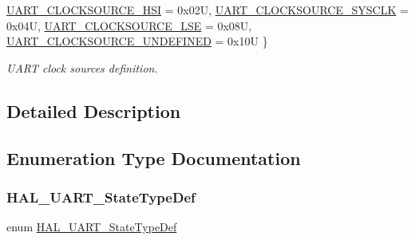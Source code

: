 \begin{DoxyCompactItemize}
\hyperlink{group___u_a_r_t___exported___types_ggad957348fe227e5cb75b70be026c5ae81af4da147f3b62642e1ce6d2cb22aff32e}{U\+A\+R\+T\+\_\+\+C\+L\+O\+C\+K\+S\+O\+U\+R\+C\+E\+\_\+\+H\+SI} = 0x02U, 
\hyperlink{group___u_a_r_t___exported___types_ggad957348fe227e5cb75b70be026c5ae81ab9abf4484d0f83bf9b3ccc8ef72a592e}{U\+A\+R\+T\+\_\+\+C\+L\+O\+C\+K\+S\+O\+U\+R\+C\+E\+\_\+\+S\+Y\+S\+C\+LK} = 0x04U, 
\hyperlink{group___u_a_r_t___exported___types_ggad957348fe227e5cb75b70be026c5ae81ab9335bad77171144c2994f1554ce3901}{U\+A\+R\+T\+\_\+\+C\+L\+O\+C\+K\+S\+O\+U\+R\+C\+E\+\_\+\+L\+SE} = 0x08U, 
\newline
\hyperlink{group___u_a_r_t___exported___types_ggad957348fe227e5cb75b70be026c5ae81a9012cc24ac82c0d7aa7558f73d770eab}{U\+A\+R\+T\+\_\+\+C\+L\+O\+C\+K\+S\+O\+U\+R\+C\+E\+\_\+\+U\+N\+D\+E\+F\+I\+N\+ED} = 0x10U
 \}\begin{DoxyCompactList}\small\item\em U\+A\+RT clock sources definition. \end{DoxyCompactList}
\end{DoxyCompactItemize}


\subsection{Detailed Description}


\subsection{Enumeration Type Documentation}
\mbox{\label{group___u_a_r_t___exported___types_gaf55d844a35379c204c90be5d1e8e50ba}} 
\subsubsection{\texorpdfstring{H\+A\+L\+\_\+\+U\+A\+R\+T\+\_\+\+State\+Type\+Def}{HAL\_UART\_StateTypeDef}}
{\footnotesize\ttfamily enum \hyperlink{group___u_a_r_t___exported___types_gaf55d844a35379c204c90be5d1e8e50ba}{H\+A\+L\+\_\+\+U\+A\+R\+T\+\_\+\+State\+Type\+Def}}



